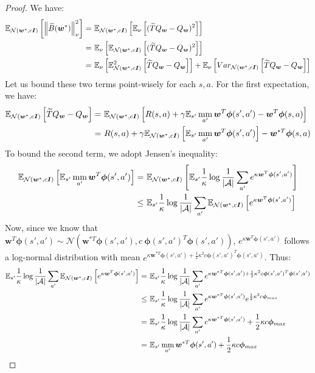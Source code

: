 \documentclass{article}
\newcommand{\mm}{\operatornamewithlimits{mm}}
\newcommand{\wt}[1]{\widetilde{#1}}
\newcommand{\norm}[1]{\left\lVert #1 \right\rVert}
\begin{document}
\begin{proof}
We have:
\begin{align}\label{eq:thg-3}
\mathbb{E}_{\mathcal{N}(\bm{w}^*,c\bm{I})}\left[\norm{\wt{B}(\bm{w}^*)}_{\nu}^2\right] =\ & \mathbb{E}_{\mathcal{N}(\bm{w}^*,c\bm{I})}\left[\mathbb{E}_{\nu}\left[(\wt{T}Q_{\bm{w}}-Q_{\bm{w}})^2\right]\right]\notag\\ =\ & \mathbb{E}_{\nu}\left[\mathbb{E}_{\mathcal{N}(\bm{w}^*,c\bm{I})}\left[(\wt{T}Q_{\bm{w}}-Q_{\bm{w}})^2\right]\right]\notag\\ =\ & \mathbb{E}_{\nu}\left[\mathbb{E}_{\mathcal{N}(\bm{w}^*,c\bm{I})}^2\left[\wt{T}Q_{\bm{w}}-Q_{\bm{w}}\right]\right]+ \mathbb{E}_{\nu}\left[Var_{\mathcal{N}(\bm{w}^*,c\bm{I})}\left[\wt{T}Q_{\bm{w}}-Q_{\bm{w}}\right]\right]
\end{align}
Let us bound these two terms point-wisely for each $s,a$. For the first expectation, we have:
\begin{align}\label{eq:thg-1}
\mathbb{E}_{\mathcal{N}(\bm{w}^*,c\bm{I})}\left[\wt{T}Q_{\bm{w}}-Q_{\bm{w}}\right] =\ & \mathbb{E}_{\mathcal{N}(\bm{w}^*,c\bm{I})}\left[R(s,a) + \gamma\mathbb{E}_{s'}\mm_{a'}\bm{w}^T\bm{\phi}(s',a') - \bm{w}^T\bm{\phi}(s,a)\right]\notag\\ =\ & R(s,a) + \gamma\mathbb{E}_{\mathcal{N}(\bm{w}^*,c\bm{I})}\left[\mathbb{E}_{s'}\mm_{a'}\bm{w}^T\bm{\phi}(s',a')\right] - \bm{w}^{*T}\bm{\phi}(s,a)
\end{align}
To bound the second term, we adopt Jensen's inequality:
\begin{align}\label{eq:thg-2}
\mathbb{E}_{\mathcal{N}(\bm{w}^*,c\bm{I})}\left[\mathbb{E}_{s'}\mm_{a'}\bm{w}^T\bm{\phi}(s',a')\right] =\ & \mathbb{E}_{\mathcal{N}(\bm{w}^*,c\bm{I})}\left[\mathbb{E}_{s'}\frac{1}{\kappa} \log \frac{1}{|\mathcal{A}|}\sum_{a'} e^{\kappa\bm{w}^T\bm{\phi}(s',a') }\right]\notag\\ \leq\ & \mathbb{E}_{s'}\frac{1}{\kappa} \log \frac{1}{|\mathcal{A}|}\sum_{a'} \mathbb{E}_{\mathcal{N}(\bm{w}^*,c\bm{I})}\left[e^{\kappa\bm{w}^T\bm{\phi}(s',a')}\right]
\end{align}
Now, since we know that $\bm{w}^T\bm{\phi}(s',a') \sim \mathcal{N}(\bm{w}^{*T}\bm{\phi}(s',a'),c\ \bm{\phi}(s',a')^T\bm{\phi}(s',a'))$, $e^{\kappa\bm{w}^T\bm{\phi}(s',a')}$ follows a log-normal distribution with mean $e^{\kappa\bm{w}^{*T}\bm{\phi}(s',a') + \frac{1}{2}\kappa^2c\bm{\phi}(s',a')^T\bm{\phi}(s',a')}$. Thus:
\begin{align*}
\mathbb{E}_{s'}\frac{1}{\kappa} \log \frac{1}{|\mathcal{A}|}\sum_{a'} \mathbb{E}_{\mathcal{N}(\bm{w}^*,c\bm{I})}\left[e^{\kappa\bm{w}^T\bm{\phi}(s',a')}\right] =\ & \mathbb{E}_{s'}\frac{1}{\kappa} \log \frac{1}{|\mathcal{A}|}\sum_{a'} e^{\kappa\bm{w}^{*T}\bm{\phi}(s',a') + \frac{1}{2}\kappa^2c\bm{\phi}(s',a')^T\bm{\phi}(s',a')}\\ \leq\ & \mathbb{E}_{s'}\frac{1}{\kappa} \log \frac{1}{|\mathcal{A}|}\sum_{a'} e^{\kappa\bm{w}^{*T}\bm{\phi}(s',a')}e^{\frac{1}{2}\kappa^2c\bm{\phi}_{max}}\\ =\ & \mathbb{E}_{s'}\frac{1}{\kappa} \log \frac{1}{|\mathcal{A}|}\sum_{a'} e^{\kappa\bm{w}^{*T}\bm{\phi}(s',a')} + \frac{1}{2}\kappa c\bm{\phi}_{max}\\ =\ & \mathbb{E}_{s'}\mm_{a'}\bm{w}^{*T}\bm{\phi}(s',a') + \frac{1}{2}\kappa c\bm{\phi}_{max}

\end{align*}
\end{proof}
\end{document}

